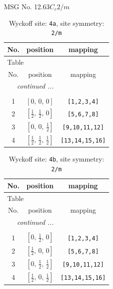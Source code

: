 \documentclass[fleqn,8pt]{jsarticle}
\begin{document}
\setcounter{MaxMatrixCols}{32}

\renewcommand{\tablename}{Table~}
\renewcommand{\figurename}{Figure~}
\begin{center}
\LARGE
MSG No. 12.63\quad$C_{c}2/m$
\end{center}
\renewcommand{\arraystretch}{1.2}
\begin{longtable}{ccc}
\caption{Wyckoff site: {\tt 4a}, site symmetry: {\tt 2/m}}
 \\
 \hline \hline
No. & position & mapping \\ \hline \endfirsthead

\multicolumn{2}{l}{\tablename\ \thetable{}} \\
 \hline \hline
No. & position & mapping \\ \hline \endhead

 \hline \hline
\multicolumn{2}{r}{\footnotesize\it continued ...} \\ \endfoot

 \hline \hline
\multicolumn{2}{r}{} \\ \endlastfoot

1 & $\left[ 0,\, 0,\, 0 \right]$ & {\tt [1,2,3,4]} \\ \hline
2 & $\left[ \frac{1}{2},\, \frac{1}{2},\, 0 \right]$ & {\tt [5,6,7,8]} \\ \hline
3 & $\left[ 0,\, 0,\, \frac{1}{2} \right]$ & {\tt [9,10,11,12]} \\ \hline
4 & $\left[ \frac{1}{2},\, \frac{1}{2},\, \frac{1}{2} \right]$ & {\tt [13,14,15,16]} \\
\end{longtable}
\renewcommand{\arraystretch}{1.2}
\begin{longtable}{ccc}
\caption{Wyckoff site: {\tt 4b}, site symmetry: {\tt 2/m}}
 \\
 \hline \hline
No. & position & mapping \\ \hline \endfirsthead

\multicolumn{2}{l}{\tablename\ \thetable{}} \\
 \hline \hline
No. & position & mapping \\ \hline \endhead

 \hline \hline
\multicolumn{2}{r}{\footnotesize\it continued ...} \\ \endfoot

 \hline \hline
\multicolumn{2}{r}{} \\ \endlastfoot

1 & $\left[ 0,\, \frac{1}{2},\, 0 \right]$ & {\tt [1,2,3,4]} \\ \hline
2 & $\left[ \frac{1}{2},\, 0,\, 0 \right]$ & {\tt [5,6,7,8]} \\ \hline
3 & $\left[ 0,\, \frac{1}{2},\, \frac{1}{2} \right]$ & {\tt [9,10,11,12]} \\ \hline
4 & $\left[ \frac{1}{2},\, 0,\, \frac{1}{2} \right]$ & {\tt [13,14,15,16]} \\
\end{longtable}
\end{document}
